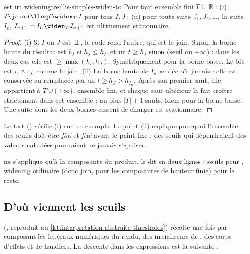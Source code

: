 \begin{theoreme}{ est un widening}{treillis-simples-widen-to}
  Pour tout ensemble fini $T \subseteq \mathbb{R}$ :
  (i) $I \join J \lleq I \widen_T J$ pour tous $I, J$ ;
  (ii) pour toute suite $J_1, J_2, \dots$, la suite $I_0$,
  $I_{n+1} = I_n \widen_T J_{n+1}$ est ultimement stationnaire.
\end{theoreme}
\begin{proof}
  (i) Si $I$ ou $J$ est $\Bot$, le code rend l'autre, qui est le join. Sinon,
  la borne haute du résultat est $h_I$ si $h_J \le h_I$, et un $t \ge h_J$
  sinon (seuil ou $+\infty$) : dans les deux cas elle est
  $\ge \max(h_I, h_J)$. Symétriquement pour la borne basse. Le bit est
  $\iota_I \wedge \iota_J$, comme le join. (ii) La borne haute de $I_n$ ne
  décroît jamais : elle est conservée ou remplacée par un $t \ge h_{J} > h_{I_n}$.
  Après son premier saut, elle appartient à $T \cup \{+\infty\}$, ensemble
  fini, et chaque saut ultérieur la fait croître strictement dans cet
  ensemble : au plus $|T| + 1$ sauts. Idem pour la borne basse. Une suite
  dont les deux bornes cessent de changer est stationnaire.
\end{proof}

Le test 
() vérifie (i) sur un exemple.
Le point (ii) explique pourquoi l'ensemble des seuils doit être \emph{fini}
et \emph{fixé} avant le point fixe : des seuils qui dépendraient des valeurs
calculées pourraient ne jamais s'épuiser.

\begin{remarque}
   ne s'applique qu'à la composante  du produit.
   le dit en deux lignes : seuils pour
  , widening ordinaire (donc join, pour les composantes de hauteur
  finie) pour le reste.
\end{remarque}


\subsection{D'où viennent les seuils}

 (,
reproduit au \cref{lst:interpretation-abstraite-thresholds}) récolte une
fois par composant les littéraux numériques du rendu, des initialiseurs de
, des corps d'effets et de handlers. La descente dans les
expressions est la suivante :

